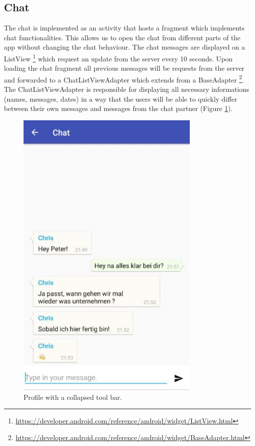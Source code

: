 \subsection{Chat}
The chat is implemented as an activity that hosts a fragment which implements chat functionalities. This allows us to open the chat from different parts of the app without changing the chat behaviour. The chat messages are displayed on a ListView \footnote{\url{https://developer.android.com/reference/android/widget/ListView.html}} which request an update from the server every 10 seconds. Upon loading the chat fragment all previous messages will be requests from the server and forwarded to a ChatListViewAdapter which extends from a BaseAdapter \footnote{\url{https://developer.android.com/reference/android/widget/BaseAdapter.html}}. The ChatListViewAdapter is responsible for displaying all necessary informations (names, messages, dates) in a way that the users will be able to quickly differ between their own messages and messages from the chat partner (Figure \ref{fig:chat}).
\begin{figure}[htbp]
	\includegraphics[width=0.8\textwidth]{images/chat.jpg}
	\centering
	\caption{Profile with a collapsed tool bar.}\label{fig:chat}
\end{figure} 



